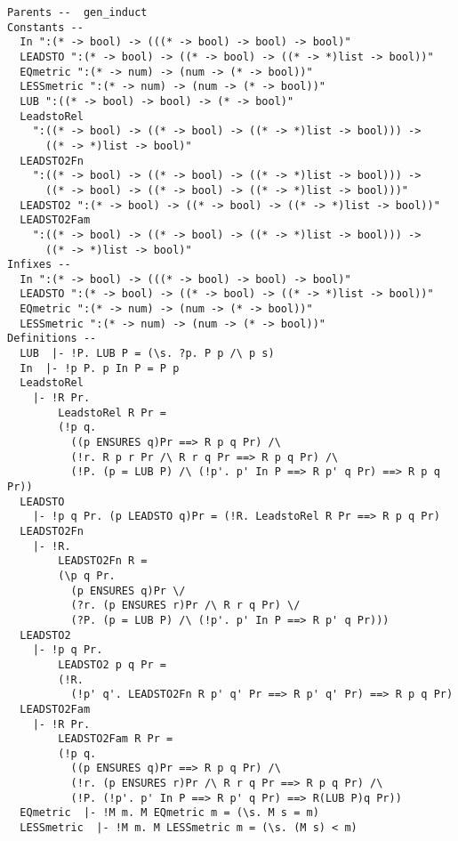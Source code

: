 {\begin{verbatim}
Parents --  gen_induct     
Constants --
  In ":(* -> bool) -> (((* -> bool) -> bool) -> bool)"
  LEADSTO ":(* -> bool) -> ((* -> bool) -> ((* -> *)list -> bool))"
  EQmetric ":(* -> num) -> (num -> (* -> bool))"
  LESSmetric ":(* -> num) -> (num -> (* -> bool))"
  LUB ":((* -> bool) -> bool) -> (* -> bool)"
  LeadstoRel
    ":((* -> bool) -> ((* -> bool) -> ((* -> *)list -> bool))) ->
      ((* -> *)list -> bool)"
  LEADSTO2Fn
    ":((* -> bool) -> ((* -> bool) -> ((* -> *)list -> bool))) ->
      ((* -> bool) -> ((* -> bool) -> ((* -> *)list -> bool)))"
  LEADSTO2 ":(* -> bool) -> ((* -> bool) -> ((* -> *)list -> bool))"
  LEADSTO2Fam
    ":((* -> bool) -> ((* -> bool) -> ((* -> *)list -> bool))) ->
      ((* -> *)list -> bool)"     
Infixes --
  In ":(* -> bool) -> (((* -> bool) -> bool) -> bool)"
  LEADSTO ":(* -> bool) -> ((* -> bool) -> ((* -> *)list -> bool))"
  EQmetric ":(* -> num) -> (num -> (* -> bool))"
  LESSmetric ":(* -> num) -> (num -> (* -> bool))"     
Definitions --
  LUB  |- !P. LUB P = (\s. ?p. P p /\ p s)
  In  |- !p P. p In P = P p
  LeadstoRel
    |- !R Pr.
        LeadstoRel R Pr =
        (!p q.
          ((p ENSURES q)Pr ==> R p q Pr) /\
          (!r. R p r Pr /\ R r q Pr ==> R p q Pr) /\
          (!P. (p = LUB P) /\ (!p'. p' In P ==> R p' q Pr) ==> R p q Pr))
  LEADSTO
    |- !p q Pr. (p LEADSTO q)Pr = (!R. LeadstoRel R Pr ==> R p q Pr)
  LEADSTO2Fn
    |- !R.
        LEADSTO2Fn R =
        (\p q Pr.
          (p ENSURES q)Pr \/
          (?r. (p ENSURES r)Pr /\ R r q Pr) \/
          (?P. (p = LUB P) /\ (!p'. p' In P ==> R p' q Pr)))
  LEADSTO2
    |- !p q Pr.
        LEADSTO2 p q Pr =
        (!R.
          (!p' q'. LEADSTO2Fn R p' q' Pr ==> R p' q' Pr) ==> R p q Pr)
  LEADSTO2Fam
    |- !R Pr.
        LEADSTO2Fam R Pr =
        (!p q.
          ((p ENSURES q)Pr ==> R p q Pr) /\
          (!r. (p ENSURES r)Pr /\ R r q Pr ==> R p q Pr) /\
          (!P. (!p'. p' In P ==> R p' q Pr) ==> R(LUB P)q Pr))
  EQmetric  |- !M m. M EQmetric m = (\s. M s = m)
  LESSmetric  |- !M m. M LESSmetric m = (\s. (M s) < m)
  

\end{verbatim}}
